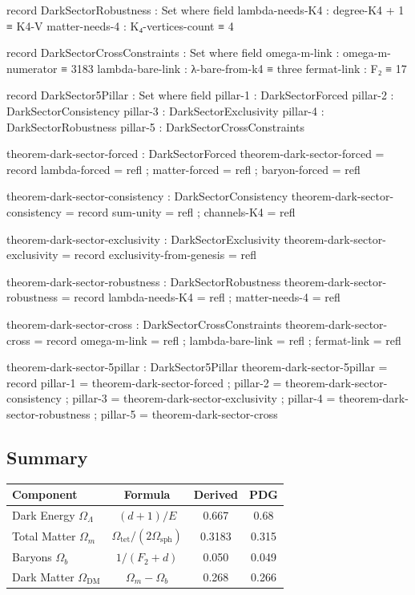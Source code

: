 \documentclass[11pt,a4paper]{book}
\begin{document}
\begin{code}
  record DarkSectorRobustness : Set where
    field
      lambda-needs-K4 : degree-K4 + 1 ≡ K4-V
      matter-needs-4  : K₄-vertices-count ≡ 4
  
  record DarkSectorCrossConstraints : Set where
    field
      omega-m-link     : omega-m-numerator ≡ 3183
      lambda-bare-link : λ-bare-from-k4 ≡ three
      fermat-link      : F₂ ≡ 17
  
  record DarkSector5Pillar : Set where
    field
      pillar-1 : DarkSectorForced
      pillar-2 : DarkSectorConsistency
      pillar-3 : DarkSectorExclusivity
      pillar-4 : DarkSectorRobustness
      pillar-5 : DarkSectorCrossConstraints
  
  theorem-dark-sector-forced : DarkSectorForced
  theorem-dark-sector-forced = record
    { lambda-forced = refl
    ; matter-forced = refl
    ; baryon-forced = refl
    }
  
  theorem-dark-sector-consistency : DarkSectorConsistency
  theorem-dark-sector-consistency = record
    { sum-unity   = refl
    ; channels-K4 = refl
    }
  
  theorem-dark-sector-exclusivity : DarkSectorExclusivity
  theorem-dark-sector-exclusivity = record
    { exclusivity-from-genesis = refl
    }
  
  theorem-dark-sector-robustness : DarkSectorRobustness
  theorem-dark-sector-robustness = record
    { lambda-needs-K4 = refl
    ; matter-needs-4  = refl
    }
  
  theorem-dark-sector-cross : DarkSectorCrossConstraints
  theorem-dark-sector-cross = record
    { omega-m-link     = refl
    ; lambda-bare-link = refl
    ; fermat-link      = refl
    }
  
  theorem-dark-sector-5pillar : DarkSector5Pillar
  theorem-dark-sector-5pillar = record
    { pillar-1 = theorem-dark-sector-forced
    ; pillar-2 = theorem-dark-sector-consistency
    ; pillar-3 = theorem-dark-sector-exclusivity
    ; pillar-4 = theorem-dark-sector-robustness
    ; pillar-5 = theorem-dark-sector-cross
    }
\end{code}

\subsection{Summary}

\begin{center}
\begin{tabular}{lccc}
\toprule
\textbf{Component} & \textbf{Formula} & \textbf{Derived} & \textbf{PDG} \\
\midrule
Dark Energy $\Omega_\Lambda$ & $(d+1)/E$ & 0.667 & 0.68 \\
Total Matter $\Omega_m$ & $\Omega_{\text{tet}}/(2\Omega_{\text{sph}})$ & 0.3183 & 0.315 \\
Baryons $\Omega_b$ & $1/(F_2 + d)$ & 0.050 & 0.049 \\
Dark Matter $\Omega_{\text{DM}}$ & $\Omega_m - \Omega_b$ & 0.268 & 0.266 \\
\bottomrule
\end{tabular}
\end{center}
\end{document}
